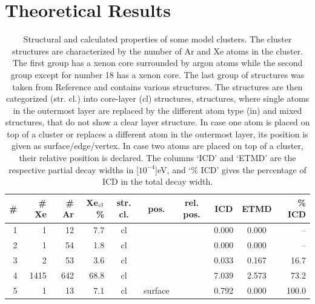 \section{Theoretical Results
\label{sec:th_results}}
%
%
\begin{table}[h]
\small
\centering
\caption{Structural and calculated properties of some model clusters.
The cluster structures are characterized by the number of
Ar and Xe atoms in the cluster. The first group has a xenon core
surrounded by argon atoms while the second group except for
number 18 has a xenon core. The last group of structures was taken
from Reference \cite{} and contains various structures.
The structures are then categorized (str. cl.) into core-layer (cl)
structures, structures, where single atoms in the outermost layer
are replaced by the different atom type (in) and mixed structures, that
do not show a clear layer structure. In case one atom is placed on top
of a cluster or replaces a different atom in the outermost layer, its
position is given as surface/edge/vertex. In case two atoms are placed
on top of a cluster, their relative position is declared.
The columns `ICD' and `ETMD'
are the respective partial decay widths
in \unit[$10^{-4}$]{eV}, and `\% ICD' gives the percentage of ICD in the
total decay width.
}
\begin{tabular}{rrrrcccccr}
\toprule
\# & \# Xe & \# Ar & Xe$_{\rm cl}$\% & str. cl. & pos. & rel. pos. & ICD   &  ETMD & \% ICD\\ %
\midrule
 1 &     1 &    12 &  7.7  & cl    &         &          & 0.000 & 0.000 &  --\\ %
 2 &     1 &    54 &  1.8  & cl    &         &          & 0.000 & 0.000 &  --\\ %
 3 &     2 &    53 &  3.6  & cl    &         &          & 0.033 & 0.167 &  16.7\\ %
 4 &  1415 &   642 & 68.8  & cl    &         &          & 7.039 & 2.573 &  73.2\\ %
                                                                                             \midrule
 5 &     1 &    13 &  7.1  & cl    & surface &          & 0.792 & 0.000 & 100.0\\ %

\end{tabular}
\end{table}
